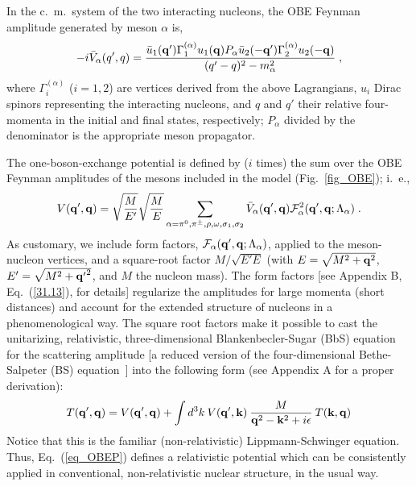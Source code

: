 In the c.~m.\ system of the two interacting nucleons, the OBE 
Feynman amplitude generated by meson $\alpha$ is,
\begin{equation}
-i\bar{V}_{\alpha}(q',q) =
\frac{\bar{u}_1({\bf q'})\Gamma_1^{(\alpha)} u_1({\bf q}) P_\alpha
\bar{u}_2(-{\bf q'})\Gamma_2^{(\alpha)} u_2(-{\bf q})}
{(q'-q)^2-m_\alpha^2} \; ,
\label{eq_OBEamp}
\end{equation}
where $\Gamma_i^{(\alpha)}$ ($i=1,2$) are vertices
derived from the above Lagrangians, $u_i$ Dirac spinors representing
the interacting nucleons, and $q$ and $q'$ their relative four-momenta
in the initial and final states, respectively; $P_\alpha$
divided by the denominator is  the
appropriate meson propagator.

The one-boson-exchange potential is defined by ($i$ times) the sum over
the OBE Feynman amplitudes of the mesons included in the model 
(Fig.~\ref{fig_OBE}); i.~e.,
\begin{equation}
V({\bf q'},{\bf q}) =
\sqrt{\frac{M}{E'}}
\sqrt{\frac{M}{E}}
\sum_{\alpha=\pi^0,\pi^\pm,\rho,\omega,\sigma_1,\sigma_2} 
\bar{V}_{\alpha}({\bf q'},{\bf q}) 
{\cal F}_{\alpha}^2({\bf q'},{\bf q}; \Lambda_\alpha) \; .
\label{eq_OBEP}
\end{equation}
As customary, we include form factors,
${\cal F}_{\alpha}({\bf q'},{\bf q}; \Lambda_\alpha)$, applied to the
meson-nucleon vertices, and a square-root factor
$M/\sqrt{E'E}$
(with $E=\sqrt{M^2+{\bf q}^2}$,
$E'=\sqrt{M^2+{\bf q'}^2}$, and $M$ the nucleon mass).
The form factors [see Appendix B, Eq.~(\ref{31.13}), for details] 
regularize the amplitudes for large momenta
(short distances) and account for the extended structure of
nucleons in a phenomenological way.
The square root factors make it possible to cast the 
unitarizing,
relativistic, three-dimensional Blankenbecler-Sugar (BbS) 
equation~\cite{BS66}
for the scattering amplitude 
[a reduced version of the four-dimensional Bethe-Salpeter (BS)
equation~\cite{SB51}] 
into the following form (see Appendix A for a proper derivation):
\begin{equation}
 {T}({\bf  q'},{\bf  q})= {V}({\bf  q'},{\bf  q})+
\int d^3k\:
{V}({\bf  q'},{\bf  k})\:
\frac{M}
{{\bf  q}^{2}-{\bf  k}^{2}+i\epsilon}\:
{T}({\bf  k},{\bf  q})
\label{eq_LS}
\end{equation}
Notice that this is the familiar
(non-relativistic) Lippmann-Schwinger
equation. Thus, Eq.~(\ref{eq_OBEP}) defines a relativistic
potential which can be consistently applied in conventional, non-relativistic
nuclear structure, in the usual way.

